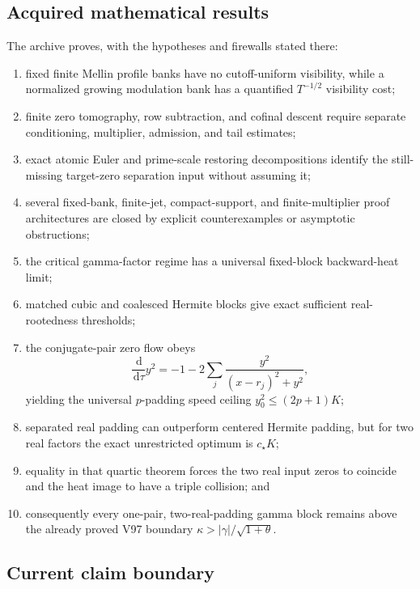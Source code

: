 \documentclass[11pt]{article}
\theoremstyle{definition}
\theoremstyle{remark}
\newcommand{\dd}{\,\mathrm d}
\begin{document}
\subsection{Acquired mathematical results}

The archive proves, with the hypotheses and firewalls stated there:
\begin{enumerate}[leftmargin=2.4em]
\item fixed finite Mellin profile banks have no cutoff-uniform visibility,
      while a normalized growing modulation bank has a quantified
      \(T^{-1/2}\) visibility cost;
\item finite zero tomography, row subtraction, and cofinal descent require
      separate conditioning, multiplier, admission, and tail estimates;
\item exact atomic Euler and prime-scale restoring decompositions identify
      the still-missing target-zero separation input without assuming it;
\item several fixed-bank, finite-jet, compact-support, and finite-multiplier
      proof architectures are closed by explicit counterexamples or
      asymptotic obstructions;
\item the critical gamma-factor regime has a universal fixed-block
      backward-heat limit;
\item matched cubic and coalesced Hermite blocks give exact sufficient
      real-rootedness thresholds;
\item the conjugate-pair zero flow obeys
      \[
      \frac{\dd}{\dd\tau}y^2
      =
      -1-2\sum_j
      \frac{y^2}{(x-r_j)^2+y^2},
      \tag{N1.3}
      \]
      yielding the universal \(p\)-padding speed ceiling
      \(y_0^2\le(2p+1)K\);
\item separated real padding can outperform centered Hermite padding, but
      for two real factors the exact unrestricted optimum is
      \(c_\star K\);
\item equality in that quartic theorem forces the two real input zeros to
      coincide and the heat image to have a triple collision; and
\item consequently every one-pair, two-real-padding gamma block remains
      above the already proved V97 boundary
      \(\kappa>|\gamma|/\sqrt{1+\theta}\).
\end{enumerate}

\subsection{Current claim boundary}
\end{document}
